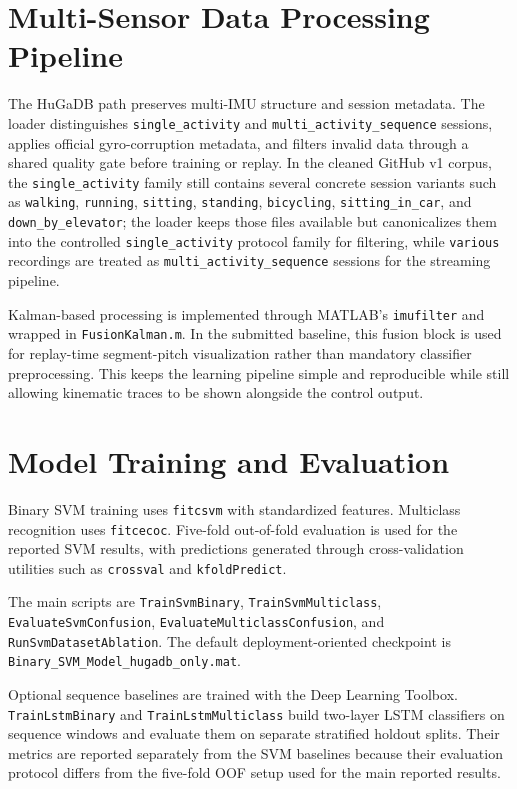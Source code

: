 \section{Multi-Sensor Data Processing Pipeline}
The HuGaDB path preserves multi-IMU structure and session metadata. The loader distinguishes \texttt{single\_activity} and \texttt{multi\_activity\_sequence} sessions, applies official gyro-corruption metadata, and filters invalid data through a shared quality gate before training or replay. In the cleaned GitHub v1 corpus, the \texttt{single\_activity} family still contains several concrete session variants such as \texttt{walking}, \texttt{running}, \texttt{sitting}, \texttt{standing}, \texttt{bicycling}, \texttt{sitting\_in\_car}, and \texttt{down\_by\_elevator}; the loader keeps those files available but canonicalizes them into the controlled \texttt{single\_activity} protocol family for filtering, while \texttt{various} recordings are treated as \texttt{multi\_activity\_sequence} sessions for the streaming pipeline.

Kalman-based processing is implemented through MATLAB's \texttt{imufilter} and wrapped in \texttt{FusionKalman.m}. In the submitted baseline, this fusion block is used for replay-time segment-pitch visualization rather than mandatory classifier preprocessing. This keeps the learning pipeline simple and reproducible while still allowing kinematic traces to be shown alongside the control output.

\section{Model Training and Evaluation}
Binary SVM training uses \texttt{fitcsvm} with standardized features. Multiclass recognition uses \texttt{fitcecoc}. Five-fold out-of-fold evaluation is used for the reported SVM results, with predictions generated through cross-validation utilities such as \texttt{crossval} and \texttt{kfoldPredict}.

The main scripts are \texttt{TrainSvmBinary}, \texttt{TrainSvmMulticlass}, \texttt{EvaluateSvmConfusion}, \texttt{EvaluateMulticlassConfusion}, and \texttt{RunSvmDatasetAblation}. The default deployment-oriented checkpoint is \texttt{Binary\_SVM\_Model\_hugadb\_only.mat}.

Optional sequence baselines are trained with the Deep Learning Toolbox. \texttt{TrainLstmBinary} and \texttt{TrainLstmMulticlass} build two-layer LSTM classifiers on sequence windows and evaluate them on separate stratified holdout splits. Their metrics are reported separately from the SVM baselines because their evaluation protocol differs from the five-fold OOF setup used for the main reported results.

